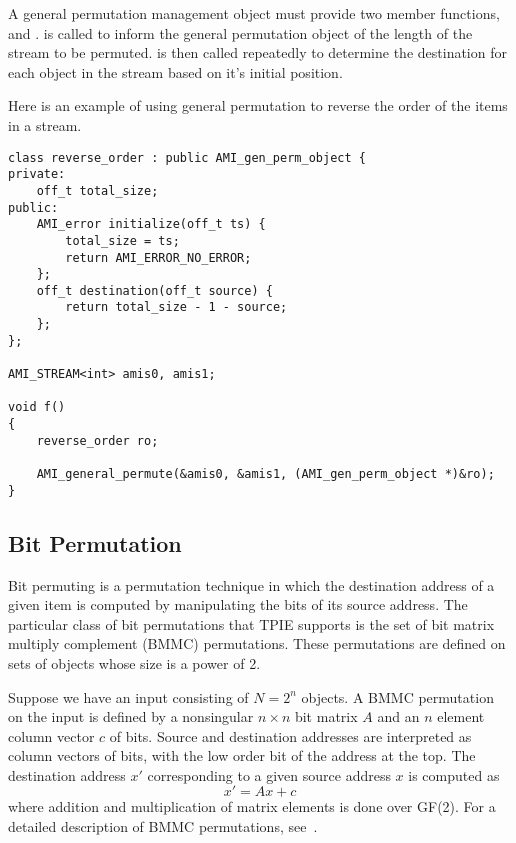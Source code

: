 A general permutation management object must provide two member
functions,  and .
 is called to inform the general permutation object
of the length of the stream to be permuted.   is
then called repeatedly to determine the destination for each object in
the stream based on it's initial position.

Here is an example of using general permutation to reverse the order
of the items in a stream.

\begin{verbatim}
class reverse_order : public AMI_gen_perm_object {
private:
    off_t total_size;
public:
    AMI_error initialize(off_t ts) { 
        total_size = ts; 
        return AMI_ERROR_NO_ERROR;
    };
    off_t destination(off_t source) {
        return total_size - 1 - source;
    };
};

AMI_STREAM<int> amis0, amis1;    

void f()
{
    reverse_order ro;

    AMI_general_permute(&amis0, &amis1, (AMI_gen_perm_object *)&ro);
}
\end{verbatim}


\subsection{Bit Permutation}


Bit permuting is a permutation technique in which the destination address
of a given item is computed by manipulating the bits of its source address.
The particular class of bit permutations that TPIE supports is the set of
bit matrix multiply complement (BMMC) permutations.  These permutations are
defined on sets of objects whose size is a power of 2.

Suppose we have an input consisting of $N = 2^n$ objects.  A BMMC
permutation on the input is defined by a nonsingular $n \times n$ bit
matrix $A$ and an $n$ element column vector $c$ of bits.  Source and
destination addresses are interpreted as column vectors of bits, with
the low order bit of the address at the top. The destination address
$x'$ corresponding to a given source address $x$ is computed as
$$x' = Ax + c$$
where addition and multiplication of matrix
elements is done over GF(2). For a detailed description of BMMC
permutations, see~\cite{cormen:integrate-tr}.

